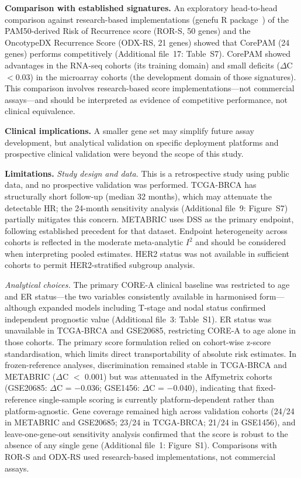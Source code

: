 \documentclass[referee,lineno,pdflatex,sn-vancouver-num]{sn-jnl}
\begin{document}
\textbf{Comparison with established signatures.} An exploratory head-to-head comparison against research-based implementations (genefu R package~\cite{gendoo2016}) of the PAM50-derived Risk of Recurrence score (ROR-S, 50 genes) and the OncotypeDX Recurrence Score (ODX-RS, 21 genes) showed that CorePAM (24 genes) performs competitively (Additional file~17: Table~S7). CorePAM showed advantages in the RNA-seq cohorts (its training domain) and small deficits ($\Delta$C $< 0.03$) in the microarray cohorts (the development domain of those signatures). This comparison involves research-based score implementations---not commercial assays---and should be interpreted as evidence of competitive performance, not clinical equivalence.

\textbf{Clinical implications.} A smaller gene set may simplify future assay development, but analytical validation on specific deployment platforms and prospective clinical validation were beyond the scope of this study.

\textbf{Limitations.} \textit{Study design and data.} This is a retrospective study using public data, and no prospective validation was performed. TCGA-BRCA has structurally short follow-up (median 32 months), which may attenuate the detectable HR; the 24-month sensitivity analysis (Additional file~9: Figure~S7) partially mitigates this concern. METABRIC uses DSS as the primary endpoint, following established precedent for that dataset. Endpoint heterogeneity across cohorts is reflected in the moderate meta-analytic $I^2$ and should be considered when interpreting pooled estimates. HER2 status was not available in sufficient cohorts to permit HER2-stratified subgroup analysis.

\textit{Analytical choices.} The primary CORE-A clinical baseline was restricted to age and ER status---the two variables consistently available in harmonised form---although expanded models including T-stage and nodal status confirmed independent prognostic value (Additional file~3: Table~S1). ER status was unavailable in TCGA-BRCA and GSE20685, restricting CORE-A to age alone in those cohorts. The primary score formulation relied on cohort-wise z-score standardisation, which limits direct transportability of absolute risk estimates. In frozen-reference analyses, discrimination remained stable in TCGA-BRCA and METABRIC ($\Delta$C $<$ 0.001) but was attenuated in the Affymetrix cohorts (GSE20685: $\Delta$C = $-$0.036; GSE1456: $\Delta$C = $-$0.040), indicating that fixed-reference single-sample scoring is currently platform-dependent rather than platform-agnostic. Gene coverage remained high across validation cohorts (24/24 in METABRIC and GSE20685; 23/24 in TCGA-BRCA; 21/24 in GSE1456), and leave-one-gene-out sensitivity analysis confirmed that the score is robust to the absence of any single gene (Additional file~1: Figure~S1). Comparisons with ROR-S and ODX-RS used research-based implementations, not commercial assays.
\end{document}
